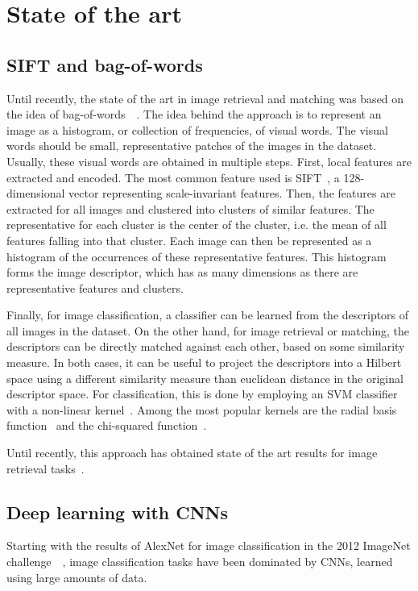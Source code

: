 
\chapter{State of the art}
\section{SIFT and bag-of-words}
Until recently, the state of the art in image retrieval and matching
was based on the idea of
bag-of-words~\cite{philbin_object_2007}~\cite{mikulik_learning_2013}.
The idea behind the approach is to represent an image as a histogram,
or collection of frequencies, of visual words. The visual words should
be small, representative patches of the images in the dataset.
Usually, these visual words are obtained in multiple steps. First,
local features are extracted and encoded. The most common feature used
is SIFT~\cite{TODO}, a 128-dimensional vector representing
scale-invariant features. Then, the features are extracted for all
images and clustered into clusters of similar features.
The representative for each cluster is the center of the cluster,
i.e. the mean of all features falling into that cluster.
Each image can then be represented as a histogram of the occurrences
of these representative features.
This histogram forms the image descriptor, which has as many dimensions
as there are representative features and clusters.

Finally, for image classification, a classifier can be learned from the
descriptors of all images in the dataset. On the other hand, for image
retrieval or matching, the descriptors can be directly matched against
each other, based on some similarity measure.
In both cases, it can be useful to project the descriptors into a Hilbert
space using a different similarity measure than euclidean distance
in the original descriptor space.
For classification, this is done by employing an SVM classifier with a
non-linear kernel~\cite{TODO}. Among the most popular kernels are the
radial basis function~\cite{} and the chi-squared function~\cite{}.

Until recently, this approach has obtained state of the art results for
image retrieval tasks~\cite{mikulik_learning_2013}.

\section{Deep learning with CNNs}
Starting with the results of AlexNet for image classification in the 2012
ImageNet challenge~\cite{krizhevsky_imagenet_2012}~\cite{TODO},
image classification tasks have been dominated by CNNs, learned using
large amounts of data.


